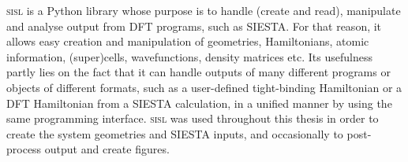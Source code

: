 \textsc{sisl}\parencite{Papior2020} is a Python library whose purpose is to handle (create and read), manipulate and analyse output from DFT programs, such as SIESTA. For that reason, it allows easy creation and manipulation of geometries, Hamiltonians, atomic information, (super)cells, wavefunctions, density matrices etc. Its usefulness partly lies on the fact that it can handle outputs of many different programs or objects of different formats, such as a user-defined tight-binding Hamiltonian or a DFT Hamiltonian from a SIESTA calculation, in a unified manner by using the same programming interface. \textsc{sisl} was used throughout this thesis in order to create the system geometries and SIESTA inputs, and occasionally to post-process output and create figures.




